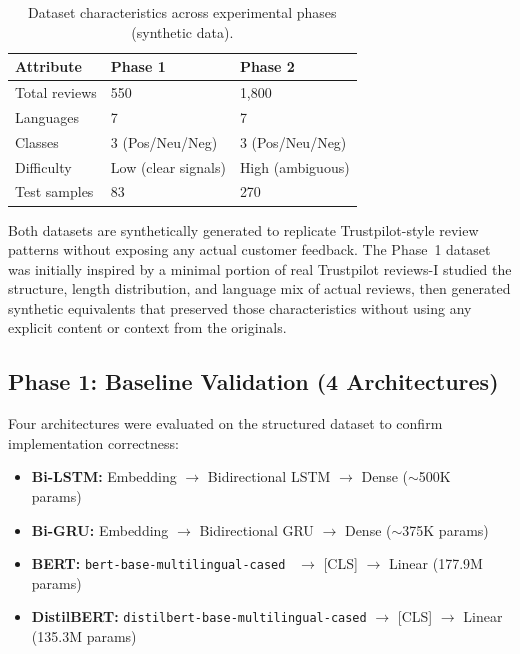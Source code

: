 \documentclass[11pt,a4paper]{article}
\begin{document}
\begin{table}[H]
\caption{Dataset characteristics across experimental phases (synthetic data).}
\setlength{\tabcolsep}{22pt}
\renewcommand{\arraystretch}{1.4}
\begin{tabular}{l l l}
\toprule
\textbf{Attribute} & \textbf{Phase 1} & \textbf{Phase 2} \\
\midrule
Total reviews & 550 & 1,800 \\
Languages & 7 & 7 \\
Classes & 3 (Pos/Neu/Neg) & 3 (Pos/Neu/Neg) \\
Difficulty & Low (clear signals) & High (ambiguous) \\
Test samples & 83 & 270 \\
\bottomrule
\end{tabular}
\end{table}

Both datasets are synthetically generated to replicate Trustpilot-style review patterns without exposing any actual customer feedback. The Phase~1 dataset was initially inspired by a minimal portion of real Trustpilot reviews-I studied the structure, length distribution, and language mix of actual reviews, then generated synthetic equivalents that preserved those characteristics without using any explicit content or context from the originals.

\subsection{Phase 1: Baseline Validation (4 Architectures)}

Four architectures were evaluated on the structured dataset to confirm implementation correctness:
\begin{itemize}[leftmargin=*,noitemsep,topsep=2pt]
    \item \textbf{Bi-LSTM:} Embedding $\rightarrow$ Bidirectional LSTM $\rightarrow$ Dense ($\sim$500K params)~\cite{hochreiter1997long}
    \item \textbf{Bi-GRU:} Embedding $\rightarrow$ Bidirectional GRU $\rightarrow$ Dense ($\sim$375K params)
    \item \textbf{BERT:} \texttt{bert-base-multilingual-cased}~\cite{devlin2019bert} $\rightarrow$ [CLS] $\rightarrow$ Linear (177.9M params)
    \item \textbf{DistilBERT:} \texttt{distilbert-base-multilingual-cased} $\rightarrow$ [CLS] $\rightarrow$ Linear (135.3M params)
\end{itemize}
\end{document}

